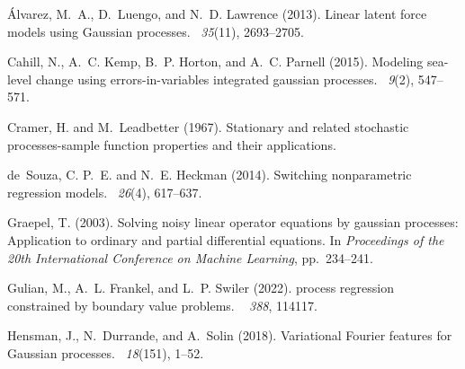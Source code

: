 \documentclass[11pt,a4paper]{article}
\theoremstyle{definition}
\theoremstyle{remark}
\begin{document}
\begin{thebibliography}{}

{\'A}lvarez, M.~A., D.~Luengo, and N.~D. Lawrence (2013).
\newblock Linear latent force models using {Gaussian} processes.
~{\em 35\/}(11), 2693--2705.

Cahill, N., A.~C. Kemp, B.~P. Horton, and A.~C. Parnell (2015).
\newblock Modeling sea-level change using errors-in-variables integrated
  gaussian processes.
~{\em 9\/}(2), 547--571.

Cramer, H. and M.~Leadbetter (1967).
\newblock Stationary and related stochastic processes-sample function
  properties and their applications.

de~Souza, C. P.~E. and N.~E. Heckman (2014).
\newblock Switching nonparametric regression models.
~{\em 26\/}(4), 617--637.

Graepel, T. (2003).
\newblock Solving noisy linear operator equations by gaussian processes:
  Application to ordinary and partial differential equations.
\newblock In {\em Proceedings of the 20th International Conference on Machine
  Learning}, pp.\  234--241.

Gulian, M., A.~L. Frankel, and L.~P. Swiler (2022).
 process regression constrained by boundary value problems.
~{\em
  388}, 114117.

Hensman, J., N.~Durrande, and A.~Solin (2018).
\newblock Variational {Fourier} features for {Gaussian} processes.
~{\em 18\/}(151), 1--52.


\end{thebibliography}
\end{document}
